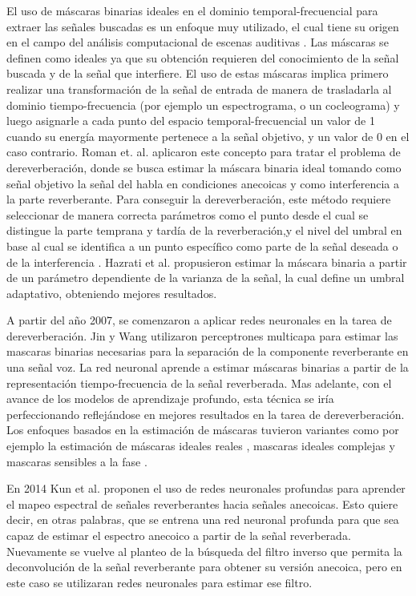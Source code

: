  
El uso de máscaras binarias ideales en el dominio temporal-frecuencial para extraer las señales buscadas \cite{binarymask} es un enfoque muy utilizado, el cual tiene su origen en el campo del análisis computacional de escenas auditivas \cite{ASA}. Las máscaras se definen como ideales ya que su obtención requieren del conocimiento de la señal buscada y de la señal que interfiere. El uso de estas máscaras implica primero realizar una transformación de la señal de entrada de manera de trasladarla al dominio tiempo-frecuencia (por ejemplo un espectrograma, o un cocleograma) y luego asignarle a cada punto del espacio temporal-frecuencial un valor de 1 cuando su energía mayormente pertenece a la señal objetivo, y un valor de 0 en el caso contrario. Roman et. al. \cite{rev_mask} aplicaron este concepto para tratar el problema de dereverberación, donde se busca estimar la máscara binaria ideal tomando como señal objetivo la señal del habla en condiciones anecoicas y como interferencia a la parte reverberante. Para conseguir la dereverberación, este método requiere seleccionar de manera correcta parámetros como el punto desde el cual se distingue la parte temprana y tardía de la reverberación,y el nivel del umbral en base al cual se identifica a un punto específico como parte de la señal deseada o de la interferencia \cite{parametros}. Hazrati et al. \cite{hazrati} propusieron estimar la máscara binaria a partir de un parámetro dependiente de la varianza de la señal, la cual define un umbral adaptativo, obteniendo mejores resultados. 

A partir del año 2007, se comenzaron a aplicar redes neuronales en la tarea de dereverberación. Jin y Wang \cite{MLP} utilizaron perceptrones multicapa para estimar las mascaras binarias necesarias para la separación de la componente reverberante en una señal voz. La red neuronal aprende a estimar máscaras binarias a partir de la representación tiempo-frecuencia de la señal reverberada. Mas adelante, con el avance de los modelos de aprendizaje profundo, esta técnica se iría perfeccionando reflejándose en mejores resultados en la tarea de dereverberación. Los enfoques basados en la estimación de máscaras tuvieron variantes como por ejemplo la estimación de máscaras ideales reales \cite{cIRM}, mascaras ideales complejas \cite{IRM} y mascaras sensibles a la fase \cite{GAN}.
  
En 2014 Kun et al. \cite{ezeKun} proponen el uso de redes neuronales profundas para aprender el mapeo espectral de señales reverberantes hacia señales anecoicas. Esto quiere decir, en otras palabras, que se entrena una red neuronal profunda para que sea capaz de estimar el espectro anecoico a partir de la señal reverberada. Nuevamente se vuelve al planteo de la búsqueda del filtro inverso que permita la deconvolución de la señal reverberante para obtener su versión anecoica, pero en este caso se utilizaran redes neuronales para estimar ese filtro. 

